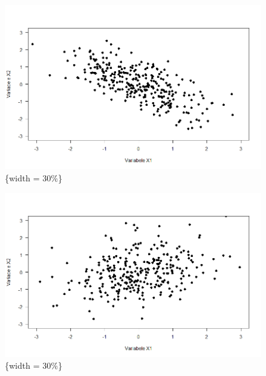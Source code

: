 \documentclass[
  letterpaper,
]{scrbook}
\begin{document}
\begin{figure}

\begin{minipage}[t]{0.33\linewidth}

{\centering 

\includegraphics{images/lecture 73.png}\{width = 30\%\}

}

\end{minipage}%
%
\begin{minipage}[t]{0.33\linewidth}

{\centering 

\includegraphics{images/lecture 74.png}\{width = 30\%\}

}

\end{minipage}%
%
\begin{minipage}[t]{0.33\linewidth}

{\centering 

}
\end{minipage}
\end{figure}
\end{document}
